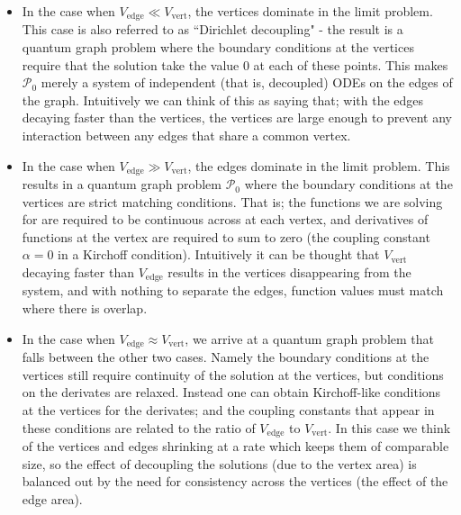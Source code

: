\begin{itemize}
	\item In the case when $V_{\mathrm{edge}} \ll V_{\mathrm{vert}}$, the vertices dominate in the limit problem.
	This case is also referred to as ``Dirichlet decoupling" - the result is a quantum graph problem where the boundary conditions at the vertices require that the solution take the value 0 at each of these points.
	This makes $\mathcal{P}_0$ merely a system of independent (that is, decoupled) ODEs on the edges of the graph.
	Intuitively we can think of this as saying that; with the edges decaying faster than the vertices, the vertices are large enough to prevent any interaction between any edges that share a common vertex.
	\item In the case when $V_{\mathrm{edge}} \gg V_{\mathrm{vert}}$, the edges dominate in the limit problem.
	This results in a quantum graph problem $\mathcal{P}_0$ where the boundary conditions at the vertices  are strict matching conditions.
	That is; the functions we are solving for are required to be continuous across at each vertex, and derivatives of functions at the vertex are required to sum to zero (the coupling constant $\alpha=0$ in a Kirchoff condition).
	Intuitively it can be thought that $V_{\mathrm{vert}}$ decaying faster than $V_{\mathrm{edge}}$ results in the vertices disappearing from the system, and with nothing to separate the edges, function values must match where there is overlap.
	\item In the case when $V_{\mathrm{edge}} \approx V_{\mathrm{vert}}$, we arrive at a quantum graph problem that falls between the other two cases.
	Namely the boundary conditions at the vertices still require continuity of the solution at the vertices, but conditions on the derivates are relaxed.
	Instead one can obtain Kirchoff-like conditions at the vertices for the derivates; and the coupling constants that appear in these conditions are related to the ratio of $V_{\mathrm{edge}}$ to $V_{\mathrm{vert}}$.
	In this case we think of the vertices and edges shrinking at a rate which keeps them of comparable size, so the effect of decoupling the solutions (due to the vertex area) is balanced out by the need for consistency across the vertices (the effect of the edge area).
\end{itemize}

